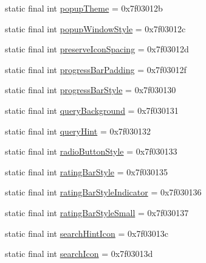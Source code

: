 \begin{DoxyCompactItemize}
\item 
static final int \mbox{\hyperlink{classandroid_1_1support_1_1v7_1_1appcompat_1_1_r_1_1attr_a53a96f272af2cd7a490b413bed6194d5}{popup\+Theme}} = 0x7f03012b
\item 
static final int \mbox{\hyperlink{classandroid_1_1support_1_1v7_1_1appcompat_1_1_r_1_1attr_ae526bade263bb7b3955a2ba8c5a3b291}{popup\+Window\+Style}} = 0x7f03012c
\item 
static final int \mbox{\hyperlink{classandroid_1_1support_1_1v7_1_1appcompat_1_1_r_1_1attr_a23842b8bdb2e8d795c6913555589c080}{preserve\+Icon\+Spacing}} = 0x7f03012d
\item 
static final int \mbox{\hyperlink{classandroid_1_1support_1_1v7_1_1appcompat_1_1_r_1_1attr_afa063791ac3308b6c783d8da10cb5657}{progress\+Bar\+Padding}} = 0x7f03012f
\item 
static final int \mbox{\hyperlink{classandroid_1_1support_1_1v7_1_1appcompat_1_1_r_1_1attr_a15645d01d21d7ada36d318d727ad9a55}{progress\+Bar\+Style}} = 0x7f030130
\item 
static final int \mbox{\hyperlink{classandroid_1_1support_1_1v7_1_1appcompat_1_1_r_1_1attr_ac8240dbb56e99878ab137f9e9d114dc0}{query\+Background}} = 0x7f030131
\item 
static final int \mbox{\hyperlink{classandroid_1_1support_1_1v7_1_1appcompat_1_1_r_1_1attr_a5bd83d9a31d5db6c3ee6efe7f860f06f}{query\+Hint}} = 0x7f030132
\item 
static final int \mbox{\hyperlink{classandroid_1_1support_1_1v7_1_1appcompat_1_1_r_1_1attr_a201b7913a0de817ec30acd0691d2625e}{radio\+Button\+Style}} = 0x7f030133
\item 
static final int \mbox{\hyperlink{classandroid_1_1support_1_1v7_1_1appcompat_1_1_r_1_1attr_ab991f58e144af354b99b3106d5d02d7d}{rating\+Bar\+Style}} = 0x7f030135
\item 
static final int \mbox{\hyperlink{classandroid_1_1support_1_1v7_1_1appcompat_1_1_r_1_1attr_a9b2194c743548e70f1332da882b63b6f}{rating\+Bar\+Style\+Indicator}} = 0x7f030136
\item 
static final int \mbox{\hyperlink{classandroid_1_1support_1_1v7_1_1appcompat_1_1_r_1_1attr_aff6925d408e9203959c03b499872814c}{rating\+Bar\+Style\+Small}} = 0x7f030137
\item 
static final int \mbox{\hyperlink{classandroid_1_1support_1_1v7_1_1appcompat_1_1_r_1_1attr_a2688f75cc82640a8a704fa001d332fb2}{search\+Hint\+Icon}} = 0x7f03013c
\item 
static final int \mbox{\hyperlink{classandroid_1_1support_1_1v7_1_1appcompat_1_1_r_1_1attr_ad99268414f1929044a1f84bf8d51ee0c}{search\+Icon}} = 0x7f03013d

\end{DoxyCompactItemize}

